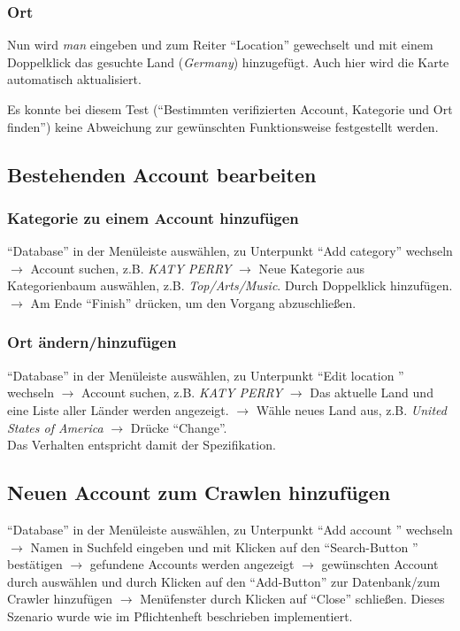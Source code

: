 \subsubsection{Ort}
Nun wird \textit{man} eingeben und zum Reiter "`Location"' gewechselt und mit einem Doppelklick das gesuchte Land (\textit{Germany}) hinzugefügt. Auch hier wird die Karte automatisch aktualisiert.

Es konnte bei diesem Test ("`Bestimmten verifizierten Account, Kategorie und Ort finden"') keine Abweichung zur gewünschten Funktionsweise festgestellt werden.
\subsection{Bestehenden Account bearbeiten}

\subsubsection{Kategorie zu einem Account hinzufügen}
"`Database"' in der Menüleiste auswählen, zu Unterpunkt "`Add category"' wechseln $\to$ Account suchen, z.B. \textit{KATY PERRY} $\to$ Neue Kategorie aus Kategorienbaum auswählen, z.B. \textit{Top/Arts/Music}. Durch Doppelklick hinzufügen. $\to$ Am Ende "`Finish"' drücken, um den Vorgang abzuschließen.
\subsubsection{Ort ändern/hinzufügen}
"`Database"' in der Menüleiste auswählen, zu Unterpunkt "`Edit location "' wechseln $\to$ Account suchen, z.B. \textit{KATY PERRY} $\to$ Das aktuelle Land und eine Liste aller Länder werden angezeigt. $\to$ Wähle neues Land aus, z.B. \textit{United States of America} $\to$ Drücke "`Change"'.\\
Das Verhalten entspricht damit der Spezifikation.

\subsection{Neuen Account zum Crawlen hinzufügen} \label{sec:AddNewAccount}
"`Database"' in der Menüleiste auswählen, zu Unterpunkt "`Add account "' wechseln $\to$ Namen in Suchfeld eingeben und mit Klicken auf den "`Search-Button "' bestätigen $\to $ gefundene Accounts werden angezeigt $\to$ gewünschten Account durch auswählen und durch Klicken auf den "`Add-Button"' zur Datenbank/zum Crawler hinzufügen $\to$ Menüfenster durch Klicken auf "`Close"' schließen.
Dieses Szenario wurde wie im Pflichtenheft beschrieben implementiert.

